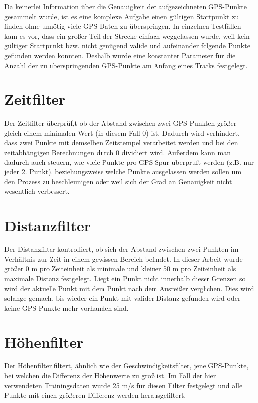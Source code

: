 
Da keinerlei Information über die Genauigkeit der aufgezeichneten GPS-Punkte gesammelt wurde, ist es eine komplexe Aufgabe einen gültigen Startpunkt zu finden ohne unnötig viele GPS-Daten zu überspringen. In einzelnen Testfällen kam es vor, dass ein großer Teil der Strecke einfach weggelassen wurde, weil kein gültiger Startpunkt bzw. nicht genügend valide und aufeinander folgende Punkte gefunden werden konnten. Deshalb wurde eine konstanter Parameter für die Anzahl der zu überspringenden GPS-Punkte am Anfang eines Tracks festgelegt.

\section*{Zeitfilter}
Der Zeitfilter überprüf,t ob der Abstand zwischen zwei GPS-Punkten größer gleich einem minimalen Wert (in diesem Fall 0) ist. Dadurch wird verhindert, dass zwei Punkte mit demselben Zeitstempel verarbeitet werden und bei den zeitabhängigen Berechnungen durch 0 dividiert wird. Außerdem kann man dadurch auch steuern, wie viele Punkte pro GPS-Spur überprüft werden  (z.B. nur jeder 2. Punkt), beziehungsweise welche Punkte ausgelassen werden sollen um den Prozess zu beschleunigen oder weil sich der Grad an Genauigkeit nicht wesentlich verbessert.

\section*{Distanzfilter}
Der Distanzfilter kontrolliert, ob sich der Abstand zwischen zwei Punkten im Verhältnis zur Zeit in einem gewissen Bereich befindet. In dieser Arbeit wurde größer 0 m pro Zeiteinheit als minimale und kleiner 50 m pro Zeiteinheit als maximale Distanz festgelegt. Liegt ein Punkt nicht innerhalb dieser Grenzen so wird der aktuelle Punkt mit dem Punkt nach dem Ausreißer verglichen. Dies wird solange gemacht bis wieder ein Punkt mit valider Distanz gefunden wird oder keine GPS-Punkte mehr vorhanden sind.

\section*{Höhenfilter}
Der Höhenfilter filtert, ähnlich wie der Geschwindigkeitsfilter, jene GPS-Punkte, bei welchen die Differenz der Höhenwerte zu groß ist. Im Fall der hier verwendeten Trainingsdaten wurde 25 m/s  für diesen Filter festgelegt und alle Punkte mit einen größeren Differenz werden herausgefiltert.

